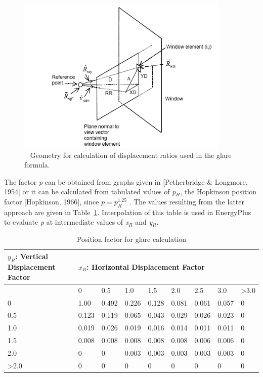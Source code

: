 \begin{figure}[hbtp] %
\centering
\includegraphics[width=0.9\textwidth, height=0.9\textheight, keepaspectratio=true]{media/image794.png}
\caption{  Geometry for calculation of displacement ratios used in the glare formula. \protect \label{fig:geometry-for-calculation-of-displacement}}
\end{figure}

The factor \emph{p} can be obtained from graphs given in {[}Petherbridge \& Longmore, 1954{]} or it can be calculated from tabulated values of \emph{p\(_{H}\)}, the Hopkinson position factor {[}Hopkinson, 1966{]}, since \(p = p_H^{1.25}\) . The values resulting from the latter approach are given in Table~\ref{table:position-factor-for-glare-calculation}. Interpolation of this table is used in EnergyPlus to evaluate \emph{p} at intermediate values of \emph{x\(_{R}\)} and \emph{y\(_{R}\)}.

\begin{longtable}[c]{p{1.2in}p{0.6in}p{0.6in}p{0.6in}p{0.6in}p{0.6in}p{0.6in}p{0.6in}p{0.6in}}
\caption{Position factor for glare calculation \label{table:position-factor-for-glare-calculation}}\\
\toprule 
$y_R$: Vertical Displacement Factor & \multicolumn{8}{l}{\textbf{$x_R$: Horizontal Displacement Factor}} \tabularnewline \cmidrule(r){2-9} \endhead
     & 0     & 0.5   & 1.0   & 1.5   & 2.0   & 2.5   & 3.0   & >3.0 \tabularnewline \midrule
0    & 1.00  & 0.492 & 0.226 & 0.128 & 0.081 & 0.061 & 0.057 & 0 \tabularnewline
0.5  & 0.123 & 0.119 & 0.065 & 0.043 & 0.029 & 0.026 & 0.023 & 0 \tabularnewline
1.0  & 0.019 & 0.026 & 0.019 & 0.016 & 0.014 & 0.011 & 0.011 & 0 \tabularnewline
1.5  & 0.008 & 0.008 & 0.008 & 0.008 & 0.008 & 0.006 & 0.006 & 0 \tabularnewline
2.0  & 0     & 0     & 0.003 & 0.003 & 0.003 & 0.003 & 0.003 & 0 \tabularnewline
>2.0 & 0     & 0     & 0     & 0     & 0     & 0     & 0     & 0 \tabularnewline
\bottomrule
\end{longtable}

